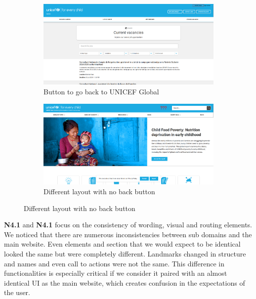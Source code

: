 \begin{figure}[h]
    \centering
	\begin{subfigure}[b]{0.48\textwidth}
        \centering
        \includegraphics[width=\textwidth]{img/critical_heuristics/N3.2a.png}
        \caption{Button to go back to UNICEF Global}
        \label{fig:N3.2a}
    \end{subfigure}
    \hfill
    \begin{subfigure}[b]{0.48\textwidth}
        \centering
        \includegraphics[width=\textwidth]{img/critical_heuristics/N3.2b.png}
        \caption{Different layout with no back button}
        \label{fig:N3.2b}
    \end{subfigure}
\end{figure}

\textbf{N4.1} and \textbf{N4.1} focus on the consistency of wording, visual and routing elements. We noticed that there are numerous inconsistencies between sub domains and the main website. Even elements and section that we would expect
to be identical looked the same but were completely different. Landmarks changed in structure and names and even call to actions were not the same. This difference in functionalities is especially critical if we consider it 
paired with an almost identical UI as the main website, which creates confusion in the expectations of the user.


